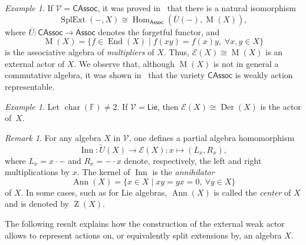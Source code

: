 \documentclass[reqno,a4paper]{amsart}
\theoremstyle{plain}
\theoremstyle{definition}
\theoremstyle{remark}
\newtheorem{remark}[subsection]{Remark}
\newtheorem{example}[subsection]{Example}
\numberwithin{equation}{section}
\newcommand{\F}{\mathbb{F}}
\newcommand{\E}{\mathcal{E}}
\newcommand{\V}{\mathcal{V}}
\DeclareMathOperator{\bchar}{char}
\DeclareMathOperator{\Hom}{Hom}
\DeclareMathOperator{\SplExt}{SplExt}
\DeclareMathOperator{\End}{End}
\DeclareMathOperator{\Der}{Der}
\DeclareMathOperator{\Inn}{Inn}
\DeclareMathOperator{\M}{M}
\DeclareMathOperator{\bZ}{Z}
\DeclareMathOperator{\Ann}{Ann}
\newcommand{\Assoc}{\ensuremath{\mathsf{Assoc}}}
\newcommand{\Lie}{\ensuremath{\mathsf{Lie}}}
\newcommand{\CAssoc}{\ensuremath{\mathsf{CAssoc}}}
\begin{document}
\begin{example}
If $\V=\CAssoc$, it was proved in~\cite[proof of Theorem 2.6]{BJK2} that there is a natural isomorphism
\[
\SplExt(-,X) \cong \Hom_\Assoc\left(\overline{U}(-),\M(X)\right),
\]
where $\overline{U} \colon \CAssoc \to \Assoc$ denotes the forgetful functor, and
\[
\M(X)=\{ f \in \End(X) \mid f(xy)=f(x)y, \; \forall x,y \in X \}
\]
is the associative algebra of \emph{multipliers} of $X$. Thus, $\E(X) \cong \M(X)$ is an external actor of $X$. We observe that, although $\M(X)$ is not in general a commutative algebra, it was shown in~\cite[Theorem 2.11]{WRAAlg} that the variety $\CAssoc$ is weakly action representable.
\end{example}

\begin{example}
Let $\bchar(\F) \neq 2$. If $\V=\Lie$, then $\E(X) \cong \Der(X)$ is the actor of~$X$.
\end{example}

\begin{remark}\label{rem_int}
For any algebra $X$ in $\V$, one defines a partial algebra homomorphism
\[
\Inn \colon \widetilde{U}(X) \to \E(X) \colon x \mapsto (L_x,R_x),
\]
where $L_x = x \cdot -$ and $R_x = - \cdot x$ denote, respectively, the left and right multiplications by $x$. The kernel of $\Inn$ is the \emph{annihilator}
\[
\Ann(X)=\{ x \in X \mid xy = yx = 0,\ \forall y \in X \}
\]
of $X$. In some cases, such as for Lie algebras, $\Ann(X)$ is called the \emph{center} of $X$ and is denoted by $\bZ(X)$.
\end{remark}

The following result explains how the construction of the external weak actor allows to represent actions on, or equivalently split extensions by, an algebra $X$.
\end{document}
